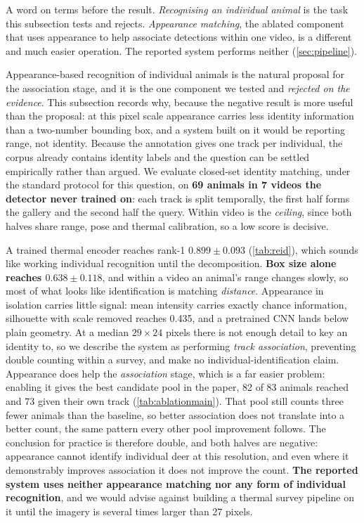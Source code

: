A word on terms before the result. \emph{Recognising an individual animal} is the task this
subsection tests and rejects. \emph{Appearance matching}, the ablated component that uses
appearance to help associate detections within one video, is a different and much easier
operation. The reported system performs neither (\cref{sec:pipeline}).

Appearance-based recognition of individual animals is the natural proposal for the association stage, and it is the one component we tested and \emph{rejected on the evidence}. This
subsection records why, because the negative result is more useful than the proposal: at this
pixel scale appearance carries less identity information than a two-number bounding box, and
a system built on it would be reporting range, not identity. Because the annotation gives one
track per individual, the corpus already contains identity labels and the question can be
settled empirically rather than argued. We evaluate closed-set identity matching, under the standard protocol for this question, on \textbf{69 animals in 7 videos the detector never trained on}: each
track is split temporally, the first half forms the gallery and the second half the query.
Within video is the \emph{ceiling}, since both halves share range, pose and thermal
calibration, so a low score is decisive.

A trained thermal encoder reaches rank-1 $0.899 \pm 0.093$ (\cref{tab:reid}), which sounds like working individual recognition until the decomposition. \textbf{Box size alone reaches
$0.638 \pm 0.118$}, and within
a video an animal's range changes slowly, so most of what looks like identification is
matching \emph{distance}. Appearance in isolation carries little signal: mean intensity carries exactly
chance information, silhouette with scale removed reaches 0.435, and a pretrained CNN lands
below plain geometry. At a median $29\times24$ pixels there is not enough detail to key an
identity to, so we describe the system as performing \emph{track association}, preventing
double counting within a survey, and make no individual-identification claim. Appearance
does help the \emph{association} stage, which is a far easier problem: enabling it gives the
best candidate pool in the paper, 82 of 83 animals reached and 73 given their own track
(\cref{tab:ablationmain}). That pool still counts three fewer animals than the baseline,
so better association does not translate into a better count, the same pattern every other
pool improvement follows. The conclusion for practice is therefore double, and both halves
are negative: appearance cannot identify individual deer at this resolution, and even where
it demonstrably improves association it does not improve the count. \textbf{The reported system uses neither appearance matching nor any form of individual recognition}, and we would advise against building a
thermal survey pipeline on it until the imagery is several times larger than 27 pixels.
